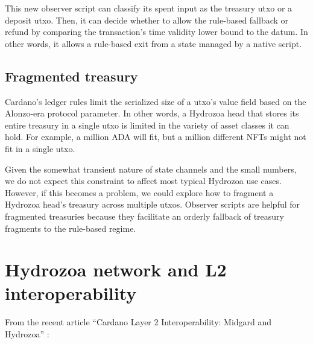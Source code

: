 \documentclass[../hydrozoa.tex]{subfiles}
\begin{document}
This new observer script can classify its spent input as the treasury utxo or a deposit utxo. Then, it can decide whether to allow the rule-based fallback or refund by comparing the transaction's time validity lower bound to the datum.
In other words, it allows a rule-based exit from a state managed by a native script.

\subsection{Fragmented treasury}%
\label{h:observer-script-fragmented-treasury}%

Cardano's ledger rules limit the serialized size of a utxo's value field based on the Alonzo-era  protocol parameter.
In other words, a Hydrozoa head that stores its entire treasury in a single utxo is limited in the variety of asset classes it can hold. For example, a million ADA will fit, but a million different NFTs might not fit in a single utxo.

Given the somewhat transient nature of state channels and the small numbers, we do not expect this constraint to affect most typical Hydrozoa use cases.
However, if this becomes a problem, we could explore how to fragment a Hydrozoa head's treasury across multiple utxos.
Observer scripts are helpful for fragmented treasuries because they facilitate an orderly fallback of treasury fragments to the rule-based regime.

\section{Hydrozoa network and L2 interoperability}%
\label{h:hydrozoa-network-l2-interoperability}%

From the recent article ``Cardano Layer 2 Interoperability:
Midgard and Hydrozoa'' \citep{FlerovskyDisarroCardanoLayer22024}:
\end{document}
